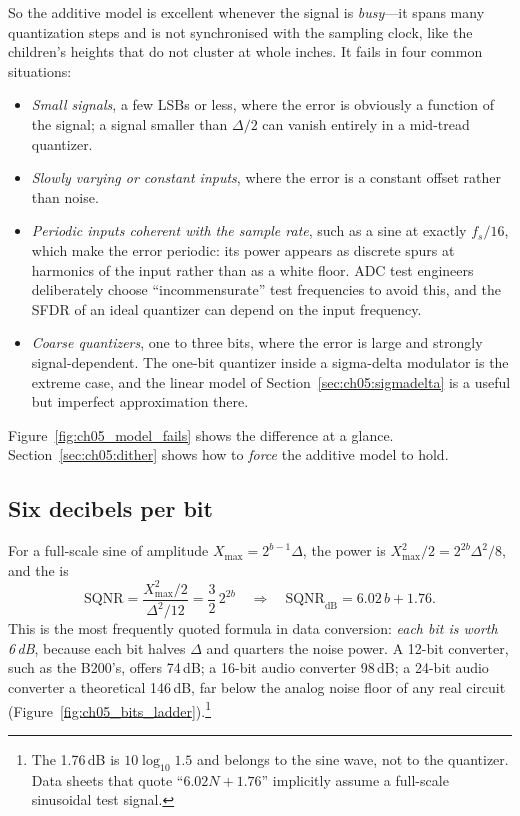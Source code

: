 So the additive model is excellent whenever the signal is \emph{busy}---it spans many quantization
steps and is not synchronised with the sampling clock, like the children's heights that do not
cluster at whole inches. It fails in four common situations:
\begin{itemize}
\item \emph{Small signals}, a few LSBs or less, where the error is obviously a function of
the signal; a signal smaller than $\Delta/2$ can vanish entirely in a mid-tread quantizer.
\item \emph{Slowly varying or constant inputs}, where the error is a constant offset rather
than noise.
\item \emph{Periodic inputs coherent with the sample rate}, such as a sine at exactly
$f_s/16$, which make the error periodic: its power appears as discrete spurs at harmonics
of the input rather than as a white floor. ADC test engineers deliberately choose
``incommensurate'' test frequencies to avoid this, and the SFDR of an ideal quantizer can
depend on the input frequency.
\item \emph{Coarse quantizers}, one to three bits, where the error is large and strongly
signal-dependent. The one-bit quantizer inside a sigma-delta modulator is the extreme case,
and the linear model of Section~\ref{sec:ch05:sigmadelta} is a useful but imperfect
approximation there.
\end{itemize}
Figure~\ref{fig:ch05_model_fails} shows the difference at a glance. Section~\ref{sec:ch05:dither}
shows how to \emph{force} the additive model to hold.

\subsection{Six decibels per bit}

For a full-scale sine of amplitude $X_{\max}=2^{b-1}\Delta$, the power is
$X_{\max}^2/2=2^{2b}\Delta^2/8$, and the  is
\begin{equation}
\text{SQNR}=\frac{X_{\max}^2/2}{\Delta^2/12}=\frac32\,2^{2b}
\quad\Longrightarrow\quad \text{SQNR}_{\text{dB}}=6.02\,b+1.76.
\label{eq:ch05:sqnr}
\end{equation}
This is the most frequently quoted formula in data conversion: \emph{each bit is worth
6\,dB}, because each bit halves $\Delta$ and quarters the noise power. A 12-bit converter,
such as the B200's, offers 74\,dB; a 16-bit audio converter 98\,dB; a 24-bit audio
converter a theoretical 146\,dB, far below the analog noise floor of any real
circuit (Figure~\ref{fig:ch05_bits_ladder}).\footnote{The 1.76\,dB is $10\log_{10}1.5$ and belongs to the sine wave, not to the
quantizer. Data sheets that quote ``$6.02N+1.76$'' implicitly assume a full-scale sinusoidal
test signal.}

